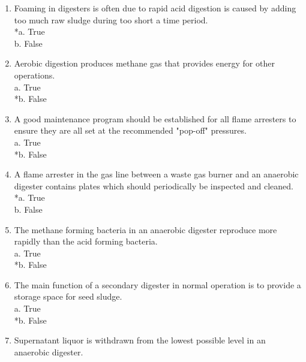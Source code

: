 \begin{enumerate}
\item  Foaming in digesters is often due to rapid acid digestion is caused by adding too much raw sludge during too short a time period. \\

*a. True \\
b. False \\

\item  Aerobic digestion produces methane gas that provides energy for other operations. \\

a. True \\
*b. False \\

\item  A good maintenance program should be established for all flame arresters to ensure they are all set at the recommended "pop-off" pressures. \\

a. True \\
*b. False \\

\item  A flame arrester in the gas line between a waste gas burner and an anaerobic digester contains plates which should periodically be inspected and cleaned. \\

*a. True \\
b. False \\

\item  The methane forming bacteria in an anaerobic digester reproduce more rapidly than the acid forming bacteria. \\

a. True \\
*b. False \\

\item  The main function of a secondary digester in normal operation is to provide a storage space for seed sludge. \\

a. True \\
*b. False \\

\item  Supernatant liquor is withdrawn from the lowest possible level in an anaerobic digester. \\


\end{enumerate}
